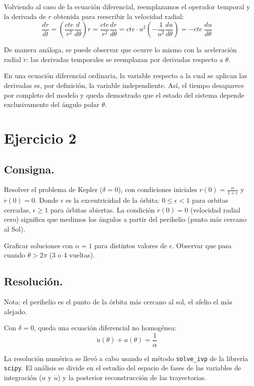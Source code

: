 \documentclass[]{report}
\begin{document}
Volviendo al caso de la ecuación diferencial, reemplazamos el operador temporal y la derivada de $r$ obtenida para reescribir la velocidad radial:
$$
\frac{dr}{dt} = \left(\frac{cte}{r^2} \frac{d}{d\theta}\right) r = \frac{cte}{r^2} \frac{dr}{d\theta} = cte \cdot u^2 \left(-\frac{1}{u^2} \frac{du}{d\theta}\right) = - cte \ \frac{du}{d\theta}
$$

De manera análoga, se puede observar que ocurre lo mismo con la aceleración radial $\ddot{r}$: las derivadas temporales se reemplazan por derivadas respecto a $\theta$.

En una ecuación diferencial ordinaria, la variable respecto a la cual se aplican las derivadas es, por definición, la variable independiente.
Así, el tiempo desaparece por completo del modelo y queda demostrado que el estado del sistema depende exclusivamente del ángulo polar $\theta$. 

\newpage

\section*{Ejercicio 2}

\subsection*{Consigna.}

Resolver el problema de Kepler ($\delta= 0$), con condiciones iniciales $r(0) = \frac{\alpha}{1 + \epsilon}$ y $\dot{r}(0) = 0$. Donde $\epsilon$
es la excentricidad de la órbita: $0 \leq \epsilon < 1$ para orbitas cerradas, $\epsilon \geq 1$ para órbitas abiertas. La
condición $\dot{r}(0) = 0$ (velocidad radial cero) significa que medimos los ángulos a partir del perihelio
(punto más cercano al Sol). 

Graficar soluciones con $\alpha = 1$ para distintos valores de $\epsilon$. Observar que pasa cuando $\theta > 2\pi$ (3 o
4 vueltas).

\subsection*{Resolución.}

Nota: el perihelio es el punto de la órbita más cercano al sol, el afelio el más alejado.

Con $\delta = 0$, queda una ecuación diferencial no homogénea:
$$
\ddot{u}(\theta) + u(\theta) = \frac{1}{\alpha}
$$

La resolución numérica se llevó a cabo usando el método \texttt{solve\_ivp} de la librería \texttt{scipy}.
El análisis se divide en el estudio del espacio de fases de las variables de integración ($u$ y $\dot{u}$) y la posterior reconstrucción de las trayectorias.
\end{document}
